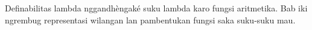 \documentclass[../../../include/open-logic-chapter]{subfiles}
\begin{document}

\begin{editorial}
Definabilitas lambda nggandhèngaké suku lambda karo fungsi aritmetika. Bab iki ngrembug representasi wilangan lan pambentukan fungsi saka suku-suku mau.
\end{editorial}


\OLEndChapterHook
\end{document}
